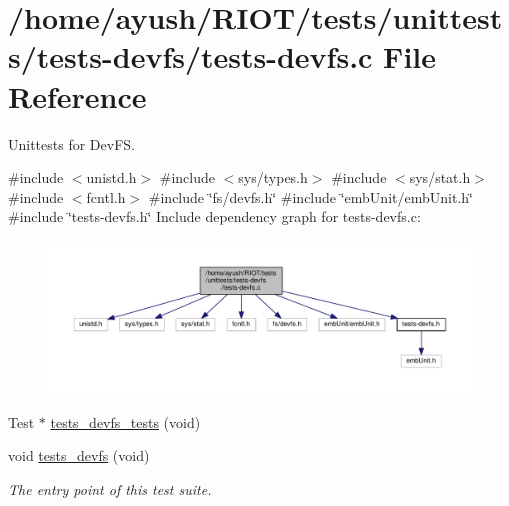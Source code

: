 \hypertarget{tests-devfs_8c}{}\section{/home/ayush/\+R\+I\+O\+T/tests/unittests/tests-\/devfs/tests-\/devfs.c File Reference}
\label{tests-devfs_8c}


Unittests for Dev\+FS.  


{\ttfamily \#include $<$unistd.\+h$>$}\newline
{\ttfamily \#include $<$sys/types.\+h$>$}\newline
{\ttfamily \#include $<$sys/stat.\+h$>$}\newline
{\ttfamily \#include $<$fcntl.\+h$>$}\newline
{\ttfamily \#include \char`\"{}fs/devfs.\+h\char`\"{}}\newline
{\ttfamily \#include \char`\"{}emb\+Unit/emb\+Unit.\+h\char`\"{}}\newline
{\ttfamily \#include \char`\"{}tests-\/devfs.\+h\char`\"{}}\newline
Include dependency graph for tests-\/devfs.c\+:
\nopagebreak
\begin{figure}[H]
\begin{center}
\leavevmode
\includegraphics[width=350pt]{tests-devfs_8c__incl}
\end{center}
\end{figure}
\begin{DoxyCompactItemize}
\item 
Test $\ast$ \hyperlink{tests-devfs_8c_a7b30a55f708f40675620d1301491bc01}{tests\+\_\+devfs\+\_\+tests} (void)
\item 
void \hyperlink{group__unittests_ga03275129153bd3a312c96576f1c15526}{tests\+\_\+devfs} (void)
\begin{DoxyCompactList}\small\item\em The entry point of this test suite. \end{DoxyCompactList}\end{DoxyCompactItemize}



